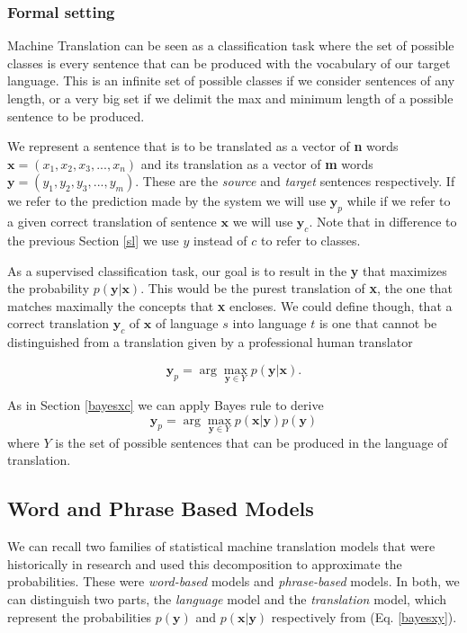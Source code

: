\documentclass[11pt,english,listoffigures,listoftables]{tfgetsinf}
\newcommand{\vect}[1]{\mathbf{#1}}
\begin{document}
\subsubsection{Formal setting}
Machine Translation can be seen as a classification task where the set of possible classes is every sentence that can be produced with the vocabulary of our target language. This is an infinite set of possible classes if we consider sentences of any length, or a very big set if we delimit the max and minimum length of a possible sentence to be produced.

We represent a sentence that is to be translated as a vector of \textbf{n} words $\vect{x} = (x_1,x_2,x_3,...,x_n)$ and its translation as a vector of \textbf{m} words $\vect{y} = (y_1,y_2,y_3,...,y_m)$. These are the \textit{source} and \textit{target} sentences respectively. If we refer to the prediction made by the system we will use $\vect{y}_p$ while if we refer to a given correct translation of sentence $\vect{x}$ we will use $\vect{y}_c$. Note that in difference to the previous Section \ref{sl} we use $y$ instead of $c$ to refer to classes.

As a supervised classification task, our goal is to result in the \textbf{y} that maximizes the probability $p(\vect{y}|\vect{x})$. 
This would be the purest translation of \textbf{x}, the one that matches maximally the concepts that \textbf{x} encloses. We could define though, that a correct translation $\vect{y}_c$ of $\vect{x}$ of language $s$ into language $t$ is one that cannot be distinguished from a translation given by a professional human translator

\begin{equation}\label{nobayesxy}
    \vect{y}_p = \arg \max_{\vect{y} \in Y} p(\vect{y}| \vect{x}).
\end{equation}

As in Section \ref{bayesxc} we can apply Bayes rule to derive  
\begin{equation}\label{bayesxy}
    \vect{y}_p = 
    \arg \max_{\vect{y} \in Y} p(\vect{x} | \vect{y}) p(\vect{y})
\end{equation}
where $Y$ is the set of possible sentences that can be produced in the language of translation. 

\subsection{Word and Phrase Based Models}\label{wordbased}
We can recall two families of statistical machine translation models that were historically in research and used this decomposition to approximate the probabilities.
These were \textit{word-based} models and \textit{phrase-based} models.
In both, we can distinguish two parts, the \textit{language} model and the \textit{translation} model, which represent the probabilities $p(\vect{y})$ and $p(\vect{x}|\vect{y})$ respectively from (Eq. \ref{bayesxy}).
\end{document}
